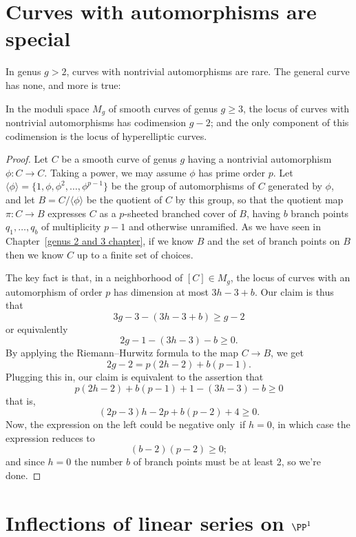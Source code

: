 \section{Curves with automorphisms are special}\label{curves with
automorphisms}

In genus $g > 2$, curves with nontrivial automorphisms are rare. The
general curve has none, and more is true:

\begin{lemma}
In the moduli space $M_g$ of smooth curves of genus $g \geq 3$, the
%
locus of curves with nontrivial automorphisms has codimension $g-2$;
and the only component of this codimension is the locus
of hyperelliptic curves.
\end{lemma}

\begin{proof}
Let $C$ be a smooth curve of genus $g$ 
having a nontrivial
automorphism $\phi : C \to C$. Taking a power, we may assume $\phi$
has prime order $p$.
Let $\langle \phi \rangle = \{1, \phi, \phi^2,\dots,\phi^{p-1} \}$
be the group of automorphisms of $C$ generated by $\phi$, and let $B =
C/\langle \phi \rangle $ be the quotient of $C$ by this group, so that
the quotient map $\pi : C \to B$ expresses $C$ as a $p$-sheeted branched
cover of $B$, having $b$ branch points $q_1,\dots, q_b$ of multiplicity
$p-1$ and otherwise unramified.
As we have seen in Chapter~\ref{genus 2 and 3 chapter}, if we know $B$
and the set
of branch points on $B$ then we know $C$ up to a finite set of choices.

The 
key fact is that,
in a neighborhood of $[C] \in M_g$, the locus of curves
with an automorphism of order $p$ has dimension at most $3h-3 + b$. Our
claim is thus that
$$
3g-3 - (3h-3+b) \geq g-2
$$
or equivalently
$$
2g - 1 - (3h-3) - b \geq 0.
$$
By applying the Riemann--Hurwitz formula to the map $C \to B$, we get
$$
2g-2 = p(2h-2) + b(p-1).
$$
Plugging this in, our claim is equivalent to the assertion that
$$
p(2h-2) + b(p-1) + 1 - (3h-3) - b \geq 0
$$
that is,
$$
(2p-3)h -2p + b(p-2) + 4 \geq 0.
$$
Now, the expression on the left could be negative only~if $h=0$, in
which case the expression reduces to
$$
(b-2)(p-2) \geq 0;
$$
and since $h=0$ the number $b$ of branch points must be at least 2,
so we're done.
\end{proof}

\section{Inflections of linear series on $\PP^1$}

